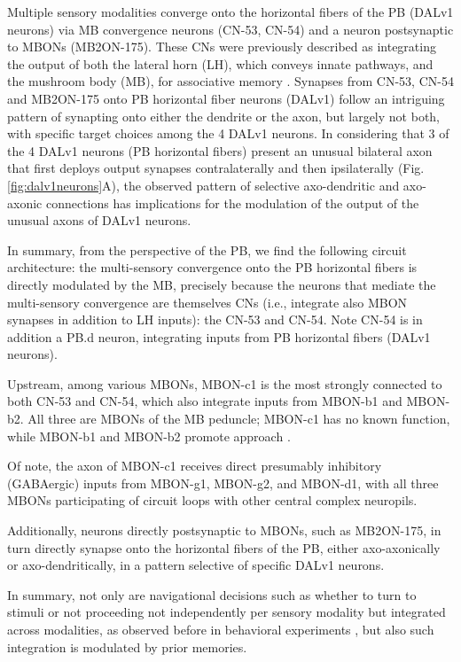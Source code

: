     Multiple sensory modalities converge onto the horizontal fibers of the PB (DALv1 neurons) via MB convergence neurons (CN-53, CN-54) and a neuron postsynaptic to MBONs (MB2ON-175).
    These CNs were previously described as integrating the output of both the lateral horn (LH), which conveys innate pathways, and the mushroom body (MB), for associative memory \citep{eschbach2021circuits}.
    Synapses from CN-53, CN-54 and MB2ON-175 onto PB horizontal fiber neurons (DALv1) follow an intriguing pattern of synapting onto either the dendrite or the axon, but largely not both, with specific target choices among the 4 DALv1 neurons.
    In considering that 3 of the 4 DALv1 neurons (PB horizontal fibers) present an unusual bilateral axon that first deploys output synapses contralaterally and then ipsilaterally (Fig. \ref{fig:dalv1neurons}A), the observed pattern of selective axo-dendritic and axo-axonic connections has implications for the modulation of the output of the unusual axons of DALv1 neurons.


    In summary, from the perspective of the PB, we find the following circuit architecture: the multi-sensory convergence onto the PB horizontal fibers is directly modulated by the MB, precisely because the neurons that mediate the multi-sensory convergence are themselves CNs (i.e., integrate also MBON synapses in addition to LH inputs): the CN-53 and CN-54. %
    Note CN-54 is in addition a PB.d neuron, integrating inputs from PB horizontal fibers (DALv1 neurons).

    Upstream, among various MBONs, MBON-c1 is the most strongly connected to both CN-53 and CN-54, which also integrate inputs from MBON-b1 and MBON-b2. All three are MBONs of the MB peduncle; MBON-c1 has no known function, while MBON-b1 and MBON-b2 promote approach \citep{eschbach2021circuits}.

    Of note, the axon of MBON-c1 receives direct presumably inhibitory (GABAergic) inputs from MBON-g1, MBON-g2, and MBON-d1, with all three MBONs participating of circuit loops with other central complex neuropils.

    Additionally, neurons directly postsynaptic to MBONs, such as MB2ON-175, in turn directly synapse onto the horizontal fibers of the PB, either axo-axonically or axo-dendritically, in a pattern selective of specific DALv1 neurons.

    In summary, not only are navigational decisions such as whether to turn to stimuli or not proceeding not independently per sensory modality but integrated across modalities, as observed before in behavioral experiments \citep{gepner2015computations}, but also such integration is modulated by prior memories.

